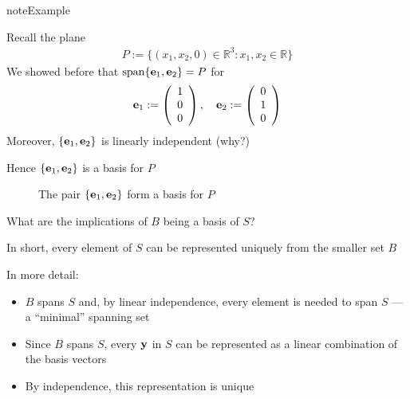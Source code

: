 \documentclass[letterpaper,10pt,english]{jupyterBook}
\begin{document}
\begin{sphinxadmonition}{note}{Example}

\sphinxAtStartPar
Recall the plane
\begin{equation*}
\begin{split}
%
P := \{ (x_1, x_2, 0) \in \mathbb{R}^3 \colon x_1, x_2 \in \mathbb{R \}}
%
\end{split}
\end{equation*}
\sphinxAtStartPar
We showed before that \(\mathrm{span}\{{\bf e}_1, {\bf e}_2\} = P\) for
\begin{equation*}
\begin{split}
%
{\bf e}_1 := 
\left(
\begin{array}{c}
1 \\
0 \\
0
\end{array}
\right),
\quad 
{\bf e}_2 := 
\left(
\begin{array}{c}
0 \\
1 \\
0
\end{array}
\right)
%
\end{split}
\end{equation*}
\sphinxAtStartPar
Moreover, \(\{{\bf e}_1, {\bf e}_2\}\) is linearly independent (why?)

\sphinxAtStartPar
Hence \(\{{\bf e}_1, {\bf e}_2\}\) is a basis for \(P\)
\end{sphinxadmonition}

\begin{figure}[htbp]
\centering
\capstart

\noindent{}
\caption{The pair \(\{{\bf e}_1, {\bf e}_2\}\) form a basis for \(P\)}\label{\detokenize{05.linear_algebra:id10}}\end{figure}

\sphinxAtStartPar
What are the implications of \(B\) being a basis of \(S\)?

\sphinxAtStartPar
In short, every element of \(S\) can be represented uniquely from the
smaller set \(B\)

\sphinxAtStartPar
In more detail:
\begin{itemize}
\item {} 
\sphinxAtStartPar
\(B\) spans \(S\) and, by linear independence, every element is needed to span \(S\) — a “minimal” spanning set

\item {} 
\sphinxAtStartPar
Since \(B\) spans \(S\), every \({\bf y}\) in \(S\) can be represented as
a linear combination of the basis vectors

\item {} 
\sphinxAtStartPar
By independence, this representation is unique

\end{itemize}
\end{document}
